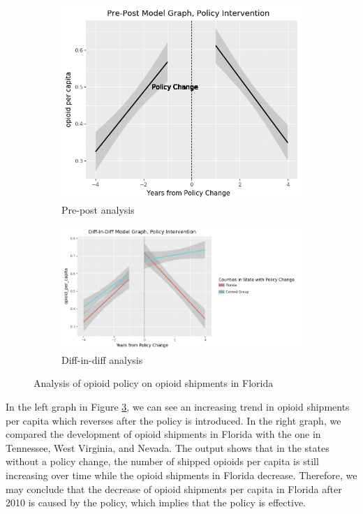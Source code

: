 \documentclass[12pt,letterpaper]{article}
\begin{document}
\begin{figure}[!h]
\centering
\begin{subfigure}{.5\textwidth}
  \centering
  \includegraphics[width=.9\linewidth]{../30_results/General_Results/florida_opioid_shipment_prepost.png}
  \caption{Pre-post analysis}
  \label{fig:fl_ship_prepost}
\end{subfigure}%
\begin{subfigure}{.5\textwidth}
  \centering
  \includegraphics[width=.9\linewidth]{../30_results/General_Results/florida_opioid_shipment_diffdiff.png}
  \caption{Diff-in-diff analysis}
  \label{fig:fl_ship_did}
\end{subfigure}
\caption{Analysis of opioid policy on opioid shipments in Florida}
\label{fig:fl_ship}
\end{figure}

In the left graph in Figure \ref{fig:fl_ship}, we can see an increasing trend in opioid shipments per capita which reverses after the policy is introduced. In the right graph, we compared the development of opioid shipments in Florida with the one in Tennessee, West Virginia, and Nevada. The output shows that in the states without a policy change, the number of shipped opioids per capita is still increasing over time while the opioid shipments in Florida decrease. Therefore, we may conclude that the decrease of opioid shipments per capita in Florida after 2010 is caused by the policy, which implies that the policy is effective. \\
\end{document}
